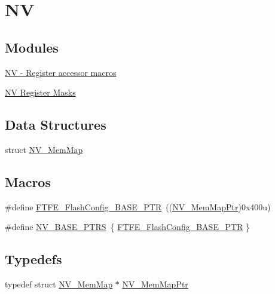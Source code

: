 \hypertarget{group___n_v___peripheral}{}\section{N\+V}
\label{group___n_v___peripheral}
\subsection*{Modules}
\begin{DoxyCompactItemize}
\item 
\hyperlink{group___n_v___register___accessor___macros}{N\+V -\/ Register accessor macros}
\item 
\hyperlink{group___n_v___register___masks}{N\+V Register Masks}
\end{DoxyCompactItemize}
\subsection*{Data Structures}
\begin{DoxyCompactItemize}
\item 
struct \hyperlink{struct_n_v___mem_map}{N\+V\+\_\+\+Mem\+Map}
\end{DoxyCompactItemize}
\subsection*{Macros}
\begin{DoxyCompactItemize}
\item 
\#define \hyperlink{group___n_v___peripheral_ga824c84d1d5dcc180128d85f4f676b4c5}{F\+T\+F\+E\+\_\+\+Flash\+Config\+\_\+\+B\+A\+S\+E\+\_\+\+P\+T\+R}~((\hyperlink{group___n_v___peripheral_ga9aac431b01e6b976f2f4e32409ab725f}{N\+V\+\_\+\+Mem\+Map\+Ptr})0x400u)
\item 
\#define \hyperlink{group___n_v___peripheral_ga1e44e66a8945b675dcebb6fbd6bdc85b}{N\+V\+\_\+\+B\+A\+S\+E\+\_\+\+P\+T\+R\+S}~\{ \hyperlink{group___n_v___peripheral_ga824c84d1d5dcc180128d85f4f676b4c5}{F\+T\+F\+E\+\_\+\+Flash\+Config\+\_\+\+B\+A\+S\+E\+\_\+\+P\+T\+R} \}
\end{DoxyCompactItemize}
\subsection*{Typedefs}
\begin{DoxyCompactItemize}
\item 
typedef struct \hyperlink{struct_n_v___mem_map}{N\+V\+\_\+\+Mem\+Map} $\ast$ \hyperlink{group___n_v___peripheral_ga9aac431b01e6b976f2f4e32409ab725f}{N\+V\+\_\+\+Mem\+Map\+Ptr}
\end{DoxyCompactItemize}


